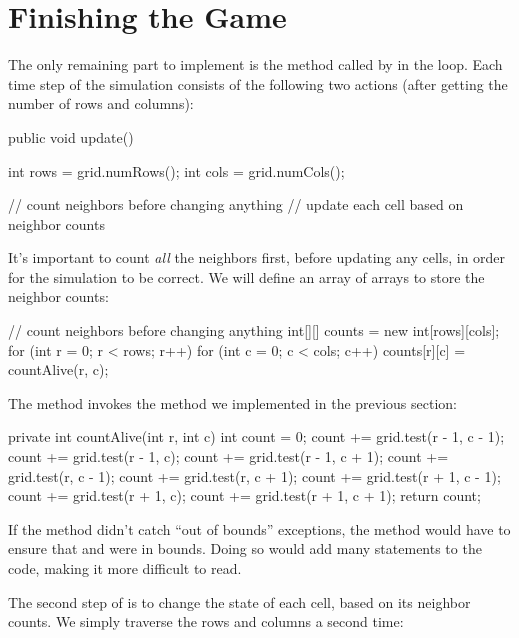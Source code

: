 \section{Finishing the Game}
\label{sec:update}

The only remaining part to implement is the  method called by  in the  loop.
Each time step of the simulation consists of the following two actions (after getting the number of rows and columns):

\begin{code}
public void update() {
    int rows = grid.numRows();
    int cols = grid.numCols();

    // count neighbors before changing anything
    // update each cell based on neighbor counts
}
\end{code}

It's important to count {\em all} the neighbors first, before updating any cells, in order for the simulation to be correct.
We will define an array of arrays to store the neighbor counts:

\begin{code}
// count neighbors before changing anything
int[][] counts = new int[rows][cols];
for (int r = 0; r < rows; r++) {
    for (int c = 0; c < cols; c++) {
        counts[r][c] = countAlive(r, c);
    }
}
\end{code}

The  method  invokes the  method we implemented in the previous section:

\begin{code}
private int countAlive(int r, int c) {
    int count = 0;
    count += grid.test(r - 1, c - 1);
    count += grid.test(r - 1, c);
    count += grid.test(r - 1, c + 1);
    count += grid.test(r, c - 1);
    count += grid.test(r, c + 1);
    count += grid.test(r + 1, c - 1);
    count += grid.test(r + 1, c);
    count += grid.test(r + 1, c + 1);
    return count;
}
\end{code}

If the  method didn't catch ``out of bounds'' exceptions, the  method would have to ensure that  and  were in bounds.
Doing so would add many  statements to the code, making it more difficult to read.

The second step of  is to change the state of each cell, based on its neighbor counts.
We simply traverse the rows and columns a second time:

